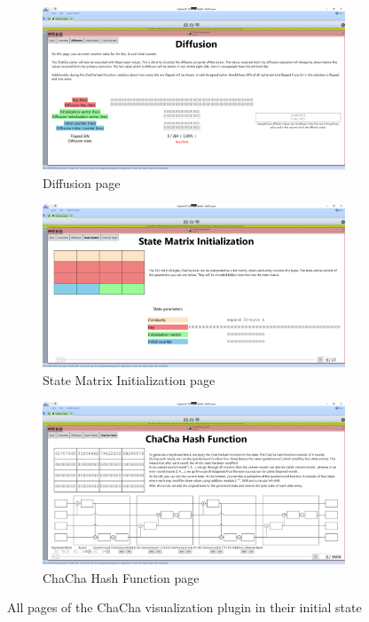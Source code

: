 \begin{figure}
\begin{subfigure}{.5\textwidth}
  \centering
  \includegraphics[width=0.99\textwidth]{figures/all-pages/3-diffusion}
  \caption{Diffusion page}
\end{subfigure}%
\begin{subfigure}{.5\textwidth}
  \centering
  \includegraphics[width=0.99\textwidth]{figures/all-pages/4-statematrix}
  \caption{State Matrix Initialization page}
\end{subfigure}

\begin{subfigure}{.5\textwidth}
  \centering
  \includegraphics[width=0.99\textwidth]{figures/all-pages/5-chachahash}
  \caption{ChaCha Hash Function page}
\end{subfigure}
\caption{All pages of the ChaCha visualization plugin in their initial state}
\label{fig:allpages}
\end{figure}

